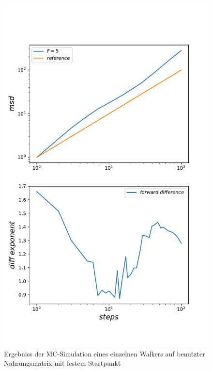 \documentclass[a4paper, 12pt]{report}
\begin{document}
\begin{figure}[H]
	\centering
	\includegraphics[scale=0.7]{single_walker_on_used_mat_nodisorderavg.pdf}
	\caption{Ergebniss der MC-Simulation eines einzelnen Walkers auf benutzter Nahrungsmatrix mit festem Startpunkt}
\end{figure}
\newpage
\end{document}

